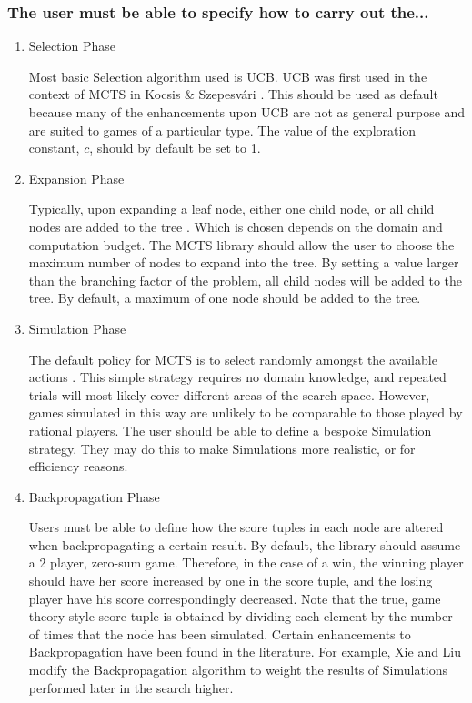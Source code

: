 \subsubsection{The user must be able to specify how to carry out the...}
\begin{enumerate}
\item {Selection} Phase
\par Most basic Selection algorithm used is {UCB}. {UCB} was first used in the context of {MCTS} in Kocsis \& Szepesv\'{a}ri \cite{kocsis06}. This should be used as default because many of the enhancements upon {UCB} are not as general purpose and are suited to games of a particular type. The value of the exploration constant, $c$, should by default be set to 1.
\item {Expansion} Phase
\par Typically, upon expanding a leaf node, either one child node, or all child nodes are added to the tree \cite{survey}.  Which is chosen depends on the domain and computation budget. The {MCTS} library should allow the user to choose the maximum number of nodes to expand into the tree. By setting a value larger than the branching factor of the problem, all child nodes will be added to the tree. By default, a maximum of one node should be added to the tree.
\item {Simulation} Phase
\par The default policy for {MCTS} is to select randomly amongst the available actions \cite{survey}. This simple strategy requires no domain knowledge, and repeated trials will most likely cover different areas of the search space. However, games simulated in this way are unlikely to be comparable to those played by rational players. The user should be able to define a bespoke Simulation strategy. They may do this to make Simulations more realistic, or for efficiency reasons.
\item {Backpropagation} Phase
\par Users must be able to define how the score tuples in each node are altered when {backpropagating} a certain result. By default, the library should assume a 2 player, zero-sum game. Therefore, in the case of a win, the winning player should have her score increased by one in the score tuple, and the losing player have his score correspondingly decreased. Note that the true, game theory style {score tuple} is obtained by dividing each element by the number of times that the node has been simulated. Certain enhancements to {Backpropagation} have been found in the literature. For example, Xie and Liu \cite{liu09} modify the {Backpropagation} algorithm to weight the results of Simulations performed later in the search higher.
\end{enumerate}

